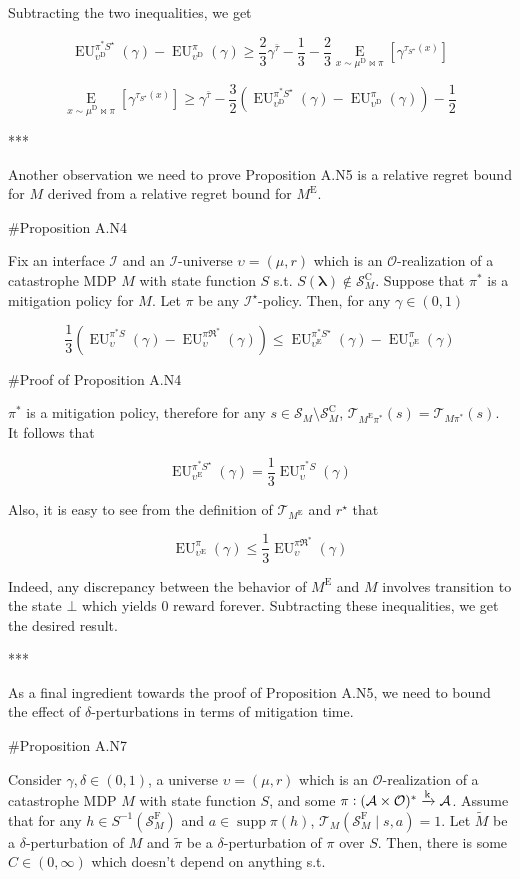 \documentclass[a4paper]{article}
\newcommand{\Comment}[1]{}
\DeclareMathOperator{\Supp}{supp}
\newcommand{\AP}[1]{\left(#1\right)}
\newcommand{\AB}[1]{\left[#1\right]}
\newcommand{\Ea}[2]{\underset{#1}{\operatorname{E}}\AB{#2}}
\newcommand{\Estr}{\boldsymbol{\lambda}}
\newcommand{\M}{\xrightarrow{\textnormal{k}}}
\newcommand{\Ob}{\mathcal{O}}
\newcommand{\A}{\mathcal{A}}
\newcommand{\St}{\mathcal{S}}
\newcommand{\T}{\mathcal{T}}
\newcommand{\In}{\mathcal{I}}
\newcommand{\FH}{(\A \times \Ob)^*}
\newcommand{\RMC}{\mathrm{C}}
\newcommand{\RMD}{\mathrm{D}}
\newcommand{\RME}{\mathrm{E}}
\newcommand{\RMF}{\mathrm{F}}
\newcommand{\SF}{\St^{\RMF}}
\newcommand{\SC}{\St^{\RMC}}
\newcommand{\ME}{M^{\RME}}
\newcommand{\UD}{\upsilon^{\RMD}}
\newcommand{\EU}{\operatorname{EU}}
\begin{document}
Subtracting the two inequalities, we get

$$\EU_{\UD}^{\pi^*S^\star}(\gamma) - \EU_{\UD}^\pi(\gamma) \geq \frac{2}{3}\gamma^{\bar{\tau}} - \frac{1}{3} - \frac{2}{3}\Ea{x\sim\mu^\RMD\bowtie\pi}{\gamma^{\tau_{S^\star}(x)}}$$

$$\Ea{x\sim\mu^\RMD\bowtie\pi}{\gamma^{\tau_{S^\star}(x)}} \geq \gamma^{\bar{\tau}} - \frac{3}{2}\AP{\EU_{\UD}^{\pi^*S^\star}(\gamma) - \EU_{\UD}^\pi(\gamma)}-\frac{1}{2}$$

***

Another observation we need to prove Proposition A.N5 is a relative regret bound for $M$ derived from a relative regret bound for $\ME$.

\#Proposition A.N4

Fix an interface $\In$ and an $\In$-universe $\upsilon=(\mu,r)$ which is an $\Ob$-realization of a catastrophe MDP $M$ with state function $S$ s.t. $S(\Estr)\not\in\SC_M$. Suppose that $\pi^*$ is a mitigation policy for $M$. Let $\pi$ be any $\In^\star$-policy. Then, for any $\gamma\in(0,1)$

$$\frac{1}{3}\AP{\EU_{\upsilon}^{\pi^* S}(\gamma)-\EU_{\upsilon}^{\pi\Re^*}(\gamma)} \leq \EU_{\upsilon^\RME}^{\pi^* S^\star}(\gamma)-\EU_{\upsilon^\RME}^{\pi}(\gamma)$$

\#Proof of Proposition A.N4

$\pi^*$ is a mitigation policy, therefore for any $s \in \St_M \setminus \SC_M$, $\T_{\ME\pi^*}(s)=\T_{M\pi^*}(s)$. It follows that 

$$\EU_{\upsilon^\RME}^{\pi^* S^\star}(\gamma) = \frac{1}{3}\EU_{\upsilon}^{\pi^* S}(\gamma)$$

Also, it is easy to see from the definition of $\T_{\ME}$ and $r^\star$ that

$$\EU_{\upsilon^\RME}^{\pi}(\gamma) \leq \frac{1}{3}\EU_{\upsilon}^{\pi\Re^*}(\gamma)$$

Indeed, any discrepancy between the behavior of $\ME$ and $M$ involves transition to the state $\bot$ which yields 0 reward forever. Subtracting these inequalities, we get the desired result.

***

As a final ingredient towards the proof of Proposition A.N5, we need to bound the effect of $\delta$-perturbations in terms of mitigation time.

\#Proposition A.N7

Consider $\gamma,\delta\in(0,1)$, a universe $\upsilon=(\mu,r)$ which is an $\Ob$-realization of a catastrophe MDP $M$ with state function $S$, and some $\pi: \FH \M \A$. Assume that for any $h \in S^{-1}\AP{\SF_M}$ and $a \in \Supp{\pi(h)}$, $\T_M\AP{\SF_M \mid s,a} = 1$. Let $\tilde{M}$ be a $\delta$-perturbation of $M$ and $\tilde{\pi}$ be a $\delta$-perturbation of $\pi$ over $S$.\Comment{ Denote $\tilde{\mu}:=\mu^{\tilde{M}}$, $\tilde{\upsilon}:=\AP{\tilde{\mu},r}$.} Then, there is some $C\in(0,\infty)$ which doesn't depend on anything s.t.
\end{document}
